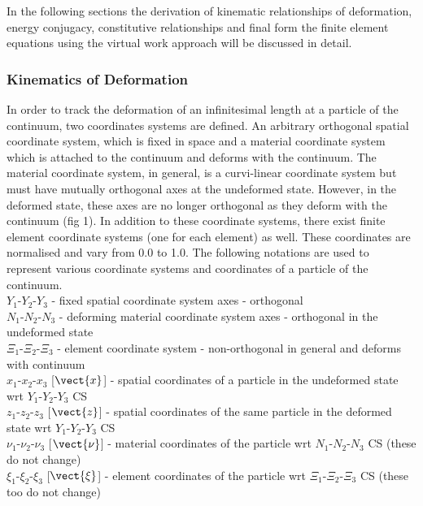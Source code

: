 In the following sections the derivation of kinematic relationships of
deformation, energy conjugacy, constitutive relationships and final form the
finite element equations using the virtual work approach will be discussed in
detail.

\subsubsection{Kinematics of Deformation}
In order to track the deformation of an infinitesimal length at a particle of
the continuum, two coordinates systems are defined. An arbitrary orthogonal
spatial coordinate system, which is fixed in space and a material coordinate
system which is attached to the continuum and deforms with the continuum. The
material coordinate system, in general, is a curvi-linear coordinate system
but must have mutually orthogonal axes at the undeformed state. However, in
the deformed state, these axes are no longer orthogonal as they deform with
the continuum (fig 1). In addition to these coordinate systems, there exist
finite element coordinate systems (one for each element) as well. These
coordinates are normalised and vary from 0.0 to 1.0. The following notations are used to represent various coordinate systems and coordinates of a particle of the continuum.\\

\noindent $Y_{1}$-$Y_{2}$-$Y_{3}$ - fixed spatial coordinate system axes - orthogonal\\
$N_{1}$-$N_{2}$-$N_{3}$ - deforming material coordinate system axes  - orthogonal in the undeformed state\\
$\Xi_{1}$-$\Xi_{2}$-$\Xi_{3}$ - element coordinate system - non-orthogonal in general and deforms with continuum\\

\noindent $x_{1}$-$x_{2}$-$x_{3}$ [$\vect{x}$] - spatial coordinates of a particle in the undeformed state wrt $Y_{1}$-$Y_{2}$-$Y_{3}$ CS \\
$z_{1}$-$z_{2}$-$z_{3}$ [$\vect{z}$] - spatial coordinates of the same particle in the deformed state wrt $Y_{1}$-$Y_{2}$-$Y_{3}$ CS \\
$\nu_{1}$-$\nu_{2}$-$\nu_{3}$ [$\vect{\nu}$] - material coordinates of the particle wrt $N_{1}$-$N_{2}$-$N_{3}$ CS (these do not change) \\
$\xi_{1}$-$\xi_{2}$-$\xi_{3}$ [$\vect{\xi}$] - element coordinates of the particle wrt $\Xi_{1}$-$\Xi_{2}$-$\Xi_{3}$ CS (these too do not change)\\

